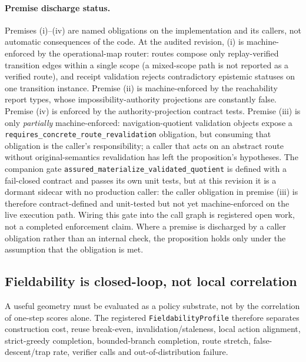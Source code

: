 \paragraph{Premise discharge status.}
Premises (i)--(iv) are named obligations on the implementation and its callers, not automatic consequences of the code. At the audited revision, (i) is machine-enforced by the operational-map router: routes compose only replay-verified transition edges within a single scope (a mixed-scope path is not reported as a verified route), and receipt validation rejects contradictory epistemic statuses on one transition instance. Premise (ii) is machine-enforced by the reachability report types, whose impossibility-authority projections are constantly false. Premise (iv) is enforced by the authority-projection contract tests. Premise (iii) is only \emph{partially} machine-enforced: navigation-quotient validation objects expose a \texttt{requires\_\allowbreak concrete\_\allowbreak route\_\allowbreak revalidation} obligation, but consuming that obligation is the caller's responsibility; a caller that acts on an abstract route without original-semantics revalidation has left the proposition's hypotheses. The companion gate \texttt{assured\_\allowbreak materialize\_\allowbreak validated\_\allowbreak quotient} is defined with a fail-closed contract and passes its own unit tests, but at this revision it is a dormant sidecar with no production caller: the caller obligation in premise (iii) is therefore contract-defined and unit-tested but not yet machine-enforced on the live execution path. Wiring this gate into the call graph is registered open work, not a completed enforcement claim. Where a premise is discharged by a caller obligation rather than an internal check, the proposition holds only under the assumption that the obligation is met.

\subsection{Fieldability is closed-loop, not local correlation}
A useful geometry must be evaluated as a policy substrate, not by the correlation of one-step scores alone. The registered \texttt{FieldabilityProfile} therefore separates construction cost, reuse break-even, invalidation/staleness, local action alignment, strict-greedy completion, bounded-branch completion, route stretch, false-descent/trap rate, verifier calls and out-of-distribution failure.

